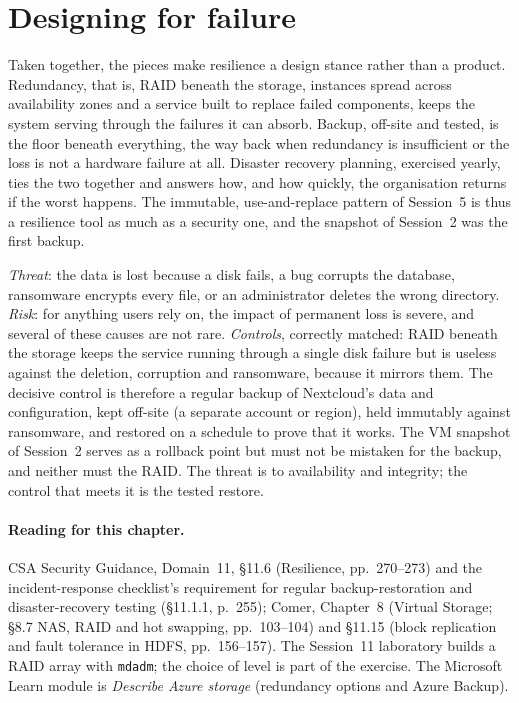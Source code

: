 \section{Designing for failure}

Taken together, the pieces make resilience a design stance rather than a
product. Redundancy, that is, RAID beneath the storage, instances spread
across availability zones and a service built to replace failed
components, keeps the system serving through the failures it can absorb.
Backup, off-site and tested, is the floor beneath everything, the way back
when redundancy is insufficient or the loss is not a hardware failure at
all. Disaster recovery planning, exercised yearly, ties the two together and
answers how, and how quickly, the organisation returns if the worst happens.
The immutable, use-and-replace pattern of Session~5 is thus a resilience
tool as much as a security one, and the snapshot of Session~2 was the first
backup.

\begin{example}\label{ex:backup-trc}
\emph{Threat}: the data is lost because a disk fails, a bug corrupts the
database, ransomware encrypts every file, or an administrator deletes the
wrong directory. \emph{Risk}: for anything users rely on, the impact of
permanent loss is severe, and several of these causes are not rare.
\emph{Controls}, correctly matched: RAID beneath the storage keeps the service
running through a single disk failure but is useless against the deletion,
corruption and ransomware, because it mirrors them. The decisive control
is therefore a regular backup of Nextcloud's data and configuration, kept
off-site (a separate account or region), held immutably against ransomware,
and restored on a schedule to prove that it works. The VM snapshot of
Session~2 serves as a rollback point but must not be mistaken for the backup,
and neither must the RAID. The threat is to availability and integrity; the
control that meets it is the tested restore.
\end{example}

\paragraph{Reading for this chapter.} CSA Security Guidance, Domain~11,
\S11.6 (Resilience, pp.~270--273) and the incident-response checklist's
requirement for regular backup-restoration and disaster-recovery testing
(\S11.1.1, p.~255); Comer, Chapter~8 (Virtual Storage; \S8.7 NAS, RAID and
hot swapping, pp.~103--104) and \S11.15 (block replication and fault
tolerance in HDFS, pp.~156--157). The Session~11 laboratory builds a RAID
array with \texttt{mdadm}; the choice of level is part of the exercise. The
Microsoft Learn module is \emph{Describe Azure storage} (redundancy options
and Azure Backup).

